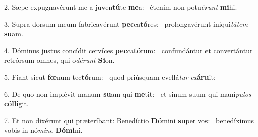 2. Sæpe expugnavérunt me a juven\textbf{tú}te \textbf{me}a: \ast\  étenim non potu\textit{é}\textit{runt} \textbf{mi}hi.\

3. Supra dorsum meum fabricavérunt \textbf{pec}ca\textbf{tó}res: \ast\  prolongavérunt iniqui\textit{tá}\textit{tem} \textbf{su}am.\

4. Dóminus justus concídit cervíces \textbf{pec}ca\textbf{tó}rum: \ast\  confundántur et convertántur retrórsum omnes, qui o\textit{dé}\textit{runt} \textbf{Si}on.\

5. Fiant sicut \textbf{fœ}num tec\textbf{tó}rum: \ast\  quod priúsquam evellá\textit{tur} \textit{ex}\textbf{á}\textbf{ru}it:\

6. De quo non implévit manum \textbf{su}am qui \textbf{me}tit: \ast\  et sinum suum qui maní\textit{pu}\textit{los} \textbf{cól}\textbf{li}git.\

7. Et non dixérunt qui præteríbant: Benedíctio \textbf{Dó}mini \textbf{su}per vos: \ast\  benedíximus vobis in nó\textit{mi}\textit{ne} \textbf{Dó}\textbf{mi}ni.\

